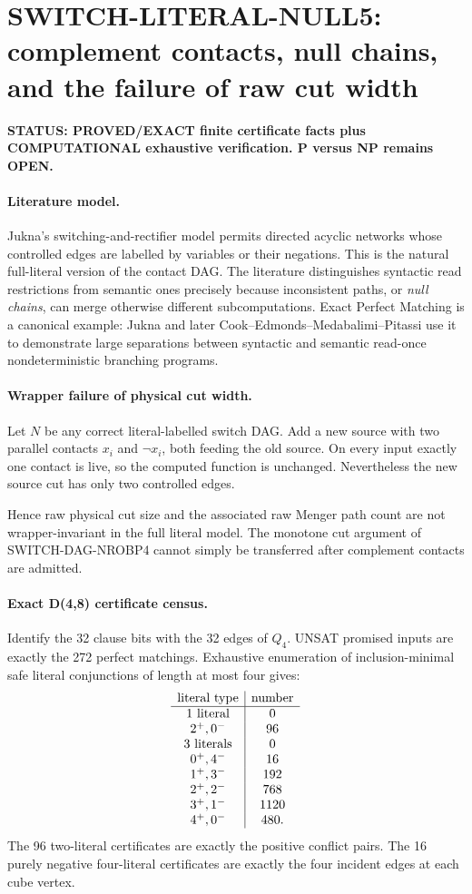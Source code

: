\section*{SWITCH-LITERAL-NULL5: complement contacts, null chains, and the failure of raw cut width}

\textbf{STATUS: PROVED/EXACT finite certificate facts plus COMPUTATIONAL exhaustive verification. P versus NP remains OPEN.}

\paragraph{Literature model.}
Jukna's switching-and-rectifier model permits directed acyclic networks whose controlled
edges are labelled by variables or their negations.  This is the natural full-literal version
of the contact DAG.  The literature distinguishes syntactic read restrictions from semantic
ones precisely because inconsistent paths, or \emph{null chains}, can merge otherwise
different subcomputations.  Exact Perfect Matching is a canonical example: Jukna and later
Cook--Edmonds--Medabalimi--Pitassi use it to demonstrate large separations between syntactic
and semantic read-once nondeterministic branching programs.

\paragraph{Wrapper failure of physical cut width.}
Let $N$ be any correct literal-labelled switch DAG.  Add a new source with two parallel
contacts $x_i$ and $\neg x_i$, both feeding the old source.  On every input exactly one
contact is live, so the computed function is unchanged.  Nevertheless the new source cut has
only two controlled edges.

Hence raw physical cut size and the associated raw Menger path count are not
wrapper-invariant in the full literal model.  The monotone cut argument of
SWITCH-DAG-NROBP4 cannot simply be transferred after complement contacts are admitted.

\paragraph{Exact D(4,8) certificate census.}
Identify the 32 clause bits with the 32 edges of $Q_4$.  UNSAT promised inputs are exactly
the 272 perfect matchings.  Exhaustive enumeration of inclusion-minimal safe literal
conjunctions of length at most four gives:
\[
\begin{array}{c|c}
\text{literal type}&\text{number}\cr
\hline
1\text{ literal}&0\cr
2^+,0^-&96\cr
3\text{ literals}&0\cr
0^+,4^-&16\cr
1^+,3^-&192\cr
2^+,2^-&768\cr
3^+,1^-&1120\cr
4^+,0^-&480.
\end{array}
\]
The 96 two-literal certificates are exactly the positive conflict pairs.  The 16 purely
negative four-literal certificates are exactly the four incident edges at each cube vertex.

